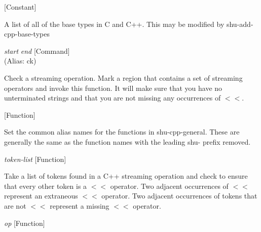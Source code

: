 \vspace{1em}
\noindent
{}
\usebox{\funcname}
 \hfill [Constant]

\begin{doc-string}
A list of all of the base types in C and C++.  This may be modified by shu-add-cpp-base-types
\end{doc-string}

\vspace{1em}
\noindent
{}
\usebox{\funcname}\emph{start} \emph{end}
 \hfill [Command]\\%
 (Alias: ck)

\begin{doc-string}
Check a streaming operation.   Mark a region that contains a set of streaming
operators and invoke this function.  It will make sure that you have no unterminated
strings and that you are not missing any occurrences of $<$$<$.
\end{doc-string}

\vspace{1em}
\noindent
{}
\usebox{\funcname}
 \hfill [Function]

\begin{doc-string}
Set the common alias names for the functions in shu-cpp-general.
These are generally the same as the function names with the leading
shu- prefix removed.
\end{doc-string}

\vspace{1em}
\noindent
{}
\usebox{\funcname}\emph{token-list}
 \hfill [Function]

\begin{doc-string}
Take a list of tokens found in a C++ streaming operation and check to
ensure that every other token is a $<$$<$ operator.  Two adjacent occurrences of $<$$<$
represent an extraneous $<$$<$ operator.  Two adjacent occurrences of tokens that
are not $<$$<$ represent a missing $<$$<$ operator.
\end{doc-string}

\vspace{1em}
\noindent
{}
\usebox{\funcname}\emph{op}
 \hfill [Function]

